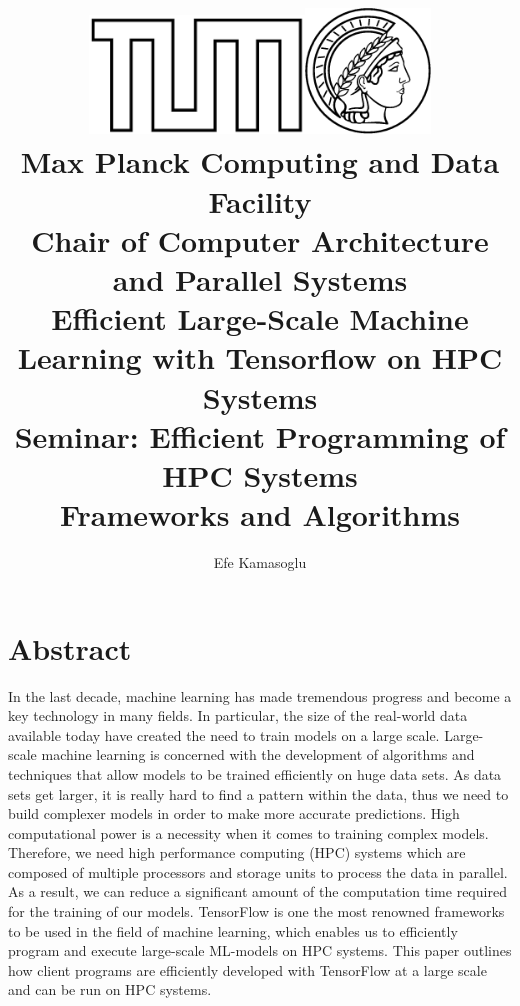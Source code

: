 \documentclass[ieeetran]{article}
\title{\includegraphics[width=0.43\textwidth]{tumlogo}\hspace{2ex}\includegraphics[width=0.25\textwidth]{maxlogo}\vspace{1ex}\\ \large \textbf{Max Planck Computing and Data Facility \\Chair of Computer Architecture and Parallel Systems} \vspace{10ex}\\ \huge Efficient Large-Scale Machine Learning with Tensorflow on HPC Systems \vspace{6ex}\\
\large Seminar: Efficient Programming of HPC Systems \\Frameworks and Algorithms\vspace{15ex}}
\author{Efe Kamasoglu}
\begin{document}
\maketitle

\pagebreak

\tableofcontents

\pagebreak


\section*{Abstract}
In the last decade, machine learning has made tremendous progress and become a key technology in many fields. In particular, the size of the real-world data available today have created the need to train models on a large scale. Large-scale machine learning is concerned with the development of algorithms and techniques that allow models to be trained efficiently on huge data sets. As data sets get larger, it is really hard to find a pattern within the data, thus we need to build complexer models in order to make more accurate predictions. High computational power is a necessity when it comes to training complex models. Therefore, we need high performance computing (HPC) systems which are composed of multiple processors and storage units to process the data in parallel. As a result, we can reduce a significant amount of the computation time required for the training of our models. TensorFlow is one the most renowned frameworks to be used in the field of machine learning, which enables us to efficiently program and execute large-scale ML-models on HPC systems. This paper outlines how client programs are efficiently developed with TensorFlow at a large scale and can be run on HPC systems.

\pagebreak
\end{document}
